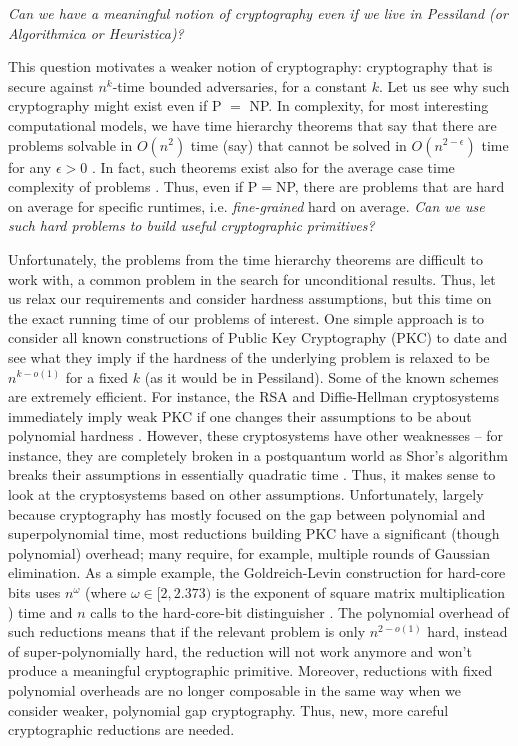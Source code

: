 \begin{center}
 \emph{	Can we have a meaningful notion of cryptography even if we live in Pessiland (or Algorithmica or Heuristica)?}
\end{center}

This question motivates a weaker notion of cryptography: cryptography that is secure against $n^k$-time bounded adversaries, for a constant $k$. Let us see why such cryptography might exist even if P $=$ NP. In complexity, for most interesting computational models, we have time hierarchy theorems that say that there are problems solvable in $O(n^2)$ time (say) that cannot be solved in $O(n^{2-\epsilon})$ time for any $\epsilon>0$ \cite{HS65,HS66,Tse56}. In fact, such theorems exist also for the average case time complexity of problems \cite{Lev73}. Thus, even if P$=$NP, there are problems that are hard on average for specific runtimes, i.e. {\em fine-grained} hard on average. {\em Can we use such hard problems to build useful cryptographic primitives?} 

Unfortunately, the problems from the time hierarchy theorems are difficult to work with, a common problem in the search for unconditional results. Thus, let us relax our requirements and consider hardness assumptions, but this time on the exact running time of our problems of interest. One simple approach is to consider all known constructions of Public Key Cryptography (PKC) to date and see what they imply if the hardness of the underlying problem is relaxed to be $n^{k-o(1)}$ for a fixed $k$ (as it would be in Pessiland). Some of the known schemes are extremely efficient. For instance, the RSA and Diffie-Hellman cryptosystems immediately imply weak PKC if one changes their assumptions to be about polynomial hardness \cite{rsa,DiffieHellman}. However, these cryptosystems have other weaknesses -- for instance, they are completely broken in a postquantum world as Shor's algorithm breaks their assumptions in essentially quadratic time \cite{Shor}. Thus, it makes sense to look at the cryptosystems based on other assumptions. Unfortunately, largely because cryptography has mostly focused on the gap between polynomial and superpolynomial time, most reductions building PKC have a significant (though polynomial) overhead; many require, for example, multiple rounds of Gaussian elimination. As a simple example,
the Goldreich-Levin  construction for hard-core bits uses $n^{\omega}$ (where $\omega\in [2,2.373)$ is the exponent of square matrix multiplication \cite{VVWmmfaster}\cite{legallMM}) time and $n$ calls to the hard-core-bit distinguisher \cite{hardCoreBitsAndXorLemmaFromGL}. The polynomial overhead of such reductions means that if the relevant problem is only $n^{2-o(1)}$ hard, instead of super-polynomially hard, the reduction will not work anymore and won't produce a meaningful cryptographic primitive. Moreover, reductions with fixed polynomial overheads are no longer composable in the same way when we consider weaker, polynomial gap cryptography. Thus, new, more careful cryptographic reductions are needed.

